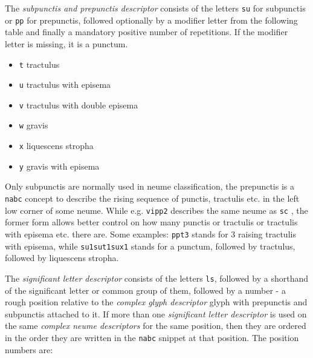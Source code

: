 \documentclass[a4paper]{article}
\begin{document}
{The \textit{subpunctis and prepunctis descriptor} consists of the letters
\texttt{su} for subpunctis or \texttt{pp} for prepunctis, followed
optionally by a modifier letter from the following table and finally a mandatory
positive number of repetitions.  If the modifier letter is missing, it is a
punctum.
\begin{itemize}
  \item \texttt{t}  tractulus
  \item \texttt{u}  tractulus with episema
  \item \texttt{v}  tractulus with double episema
  \item \texttt{w}  gravis
  \item \texttt{x}  liquescens stropha
  \item \texttt{y}  gravis with episema
\end{itemize}
Only subpunctis are normally used in neume classification, the prepunctis is
a \texttt{nabc} concept to describe the rising sequence of punctis, tractulis etc.
in the left low corner of some neume.  While e.g. \texttt{vipp2}
 describes the same neume as \texttt{sc} , the
former form allows better control on how many punctis or tractulis or
tractulis with episema etc. there are.  Some examples:
\texttt{ppt3}  stands for 3 raising tractulis with episema,
while \texttt{su1sut1sux1}  stands for a punctum,
followed by tractulus, followed by liquescens stropha.

The \textit{significant letter descriptor} consists of the letters
\texttt{ls}, followed by a shorthand of the significant letter or common
group of them, followed by a number - a rough position relative to the
\textit{complex glyph descriptor} glyph with prepunctis and subpunctis
attached to it.  If more than one \textit{significant letter descriptor}
is used on the same \textit{complex neume descriptors} for the same
position, then they are ordered in the order they are written in the
\texttt{nabc} snippet at that position.  The position numbers are:


\\
\makebox[6cm][l]{}
\\
\\


}
\end{document}
